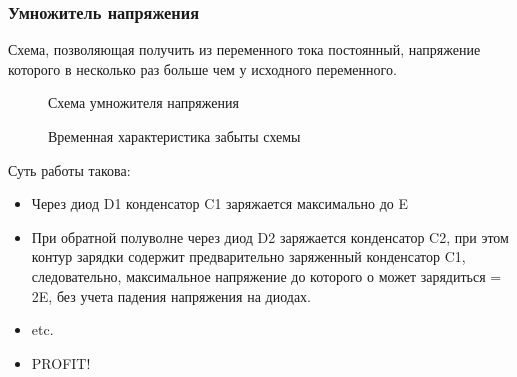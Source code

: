 \subsubsection{Умножитель напряжения}

Схема, позволяющая получить из переменного тока постоянный, напряжение которого в несколько раз больше чем у исходного переменного.

\begin{center}
	\begin{figure}[H]
		\caption{Схема умножителя напряжения}
	\end{figure}
\end{center} 


\begin{center}
	\begin{figure}[H]
		\caption{Временная характеристика забыты схемы}
	\end{figure}
\end{center} 

Суть работы такова:
\begin{itemize}
\item Через диод D1 конденсатор C1 заряжается максимально до E
\item При обратной полуволне через диод D2 заряжается конденсатор C2, при этом контур зарядки содержит предварительно заряженный конденсатор C1, следовательно, максимальное напряжение до которого о может зарядиться = 2E, без учета падения напряжения на диодах.
\item etc.
\item PROFIT!
\end{itemize}

